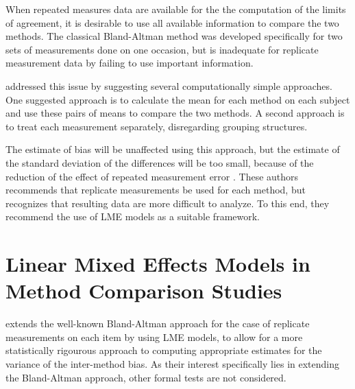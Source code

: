 \documentclass[12pt, a4paper]{report}
\theoremstyle{plain}
\theoremstyle{definition}
\theoremstyle{remark}
\begin{document}
When repeated measures data are available for the the computation of the limits of agreement, it is desirable to use all available information to compare the two methods. The classical Bland-Altman method was developed specifically for two sets of measurements done on one occasion, but is inadequate for replicate measurement data by failing to use important information.

\citet{BA99} addressed this issue by suggesting several computationally simple approaches. One suggested approach is to calculate the mean for each method on each subject and use these pairs of means to compare the two methods. A second approach is to treat each measurement separately, disregarding grouping structures. 

The estimate of bias will be unaffected using this approach, but the estimate of the standard deviation of the differences will be too small, because of the reduction of the effect of repeated measurement error \citep{BXC2004,BXC2008}. These authors recommends that replicate measurements be used for each method, but recognizes that resulting data are more difficult to analyze. To this end, they recommend the use of LME models as a suitable framework.


\section{Linear Mixed Effects Models in Method Comparison Studies}

	
	
	
	
\citet{BXC2008} extends the well-known Bland-Altman approach for the case of replicate measurements on each item by using LME models, to allow for a more statistically rigourous approach to computing appropriate estimates for the variance of the inter-method bias. As their interest specifically lies in extending the Bland-Altman approach, other formal tests are not considered.  
	
\end{document}
